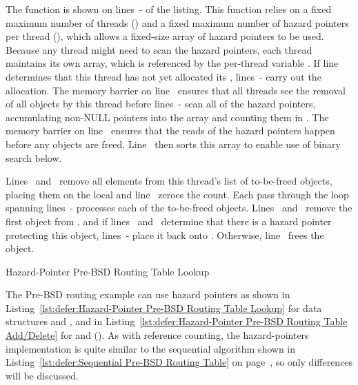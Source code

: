 \begin{lineref}
The  function is shown on lines~-
of the listing.
This function relies on a fixed maximum number of threads ()
and a fixed maximum number of hazard pointers per thread (),
which allows a fixed-size array of hazard pointers to be used.
Because any thread might need to scan the hazard pointers, each thread
maintains its own array, which is referenced by the per-thread variable
.
If line~ determines that this thread has not yet allocated its
, lines~- carry out the allocation.
The memory barrier on line~ ensures that all threads see the
removal of all objects by this thread before
lines~- scan
all of the hazard pointers, accumulating non-NULL pointers into
the  array and counting them in .
The memory barrier on line~ ensures that the reads of
the hazard pointers
happen before any objects are freed.
Line~ then sorts this array to enable use of binary search below.

Lines~ and~
remove all elements from this thread's list of
to-be-freed objects, placing them on the local 
and line~ zeroes the count.
Each pass through the loop spanning
lines~- processes each
of the to-be-freed objects.
Lines~ and~
remove the first object from ,
and if lines~ and~
determine that there is a hazard pointer
protecting this object, lines~-
place it back onto .
Otherwise, line~ frees the object.
\end{lineref}

\begin{listing}[tbp]

\caption{Hazard-Pointer Pre-BSD Routing Table Lookup}
\label{lst:defer:Hazard-Pointer Pre-BSD Routing Table Lookup}
\end{listing}

The Pre-BSD routing example can use hazard pointers as shown in
Listing~\ref{lst:defer:Hazard-Pointer Pre-BSD Routing Table Lookup}
for data structures and , and in
Listing~\ref{lst:defer:Hazard-Pointer Pre-BSD Routing Table Add/Delete}
for  and 
().
As with reference counting, the hazard-pointers implementation
is quite similar to the sequential algorithm shown in
Listing~\ref{lst:defer:Sequential Pre-BSD Routing Table}
on
page~\pageref{lst:defer:Sequential Pre-BSD Routing Table},
so only differences will be discussed.

